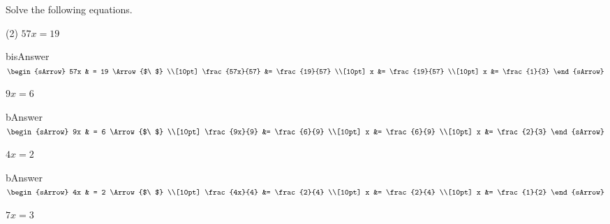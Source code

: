 \clearpage\noindent%
Solve the following equations.
\begin{mtask}(2)
    \task[] $ 57x = 19 $
              \begin{envOut}[equal height group=A-Rev-1]{bisAnswer}
			       $\begin{sArrow}
			              57x & = 19            \Arrow{$\ $} \\[10pt]
                          \frac{57x}{57} &= \frac{19}{57}    \\[10pt] 
                          x &= \frac{19}{57}	             \\[10pt] 					  
					      x &= \frac{1}{3}  
	                \end{sArrow}$
              \end{envOut}
    \task[] $ 9x = 6 $
              \begin{envOut}[equal height group=A-Rev-1]{bAnswer}
			       $\begin{sArrow}
			              9x & = 6           \Arrow{$\ $} \\[10pt]
                          \frac{9x}{9} &= \frac{6}{9}    \\[10pt] 
                          x &= \frac{6}{9}	             \\[10pt] 					  
					      x &= \frac{2}{3}  
	                \end{sArrow}$
              \end{envOut}
    \task[] $ 4x = 2 $
              \begin{envOut}[equal height group=A-Rev-1]{bAnswer}
			       $\begin{sArrow}
			              4x & = 2           \Arrow{$\ $} \\[10pt]
                          \frac{4x}{4} &= \frac{2}{4}    \\[10pt] 
                          x &= \frac{2}{4}	             \\[10pt] 					  
					      x &= \frac{1}{2}  
	                \end{sArrow}$
              \end{envOut}
    \task[] $7x =3 $
\end{mtask}
